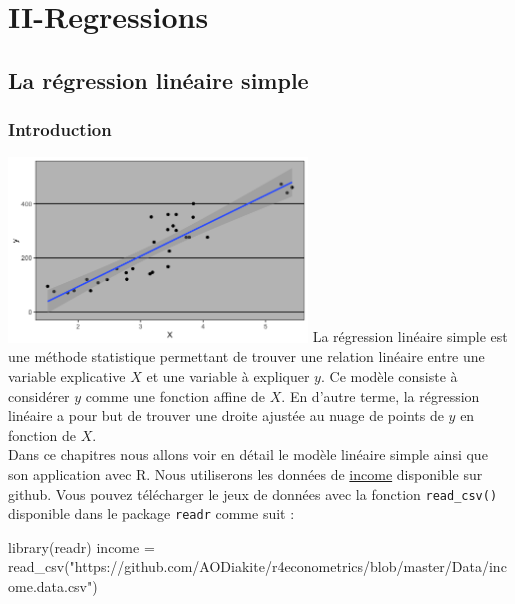 \documentclass[
]{book}
\newenvironment{Shaded}{\begin{snugshade}}{\end{snugshade}}
\newcommand{\FunctionTok}[1]{\textcolor[rgb]{0.00,0.00,0.00}{#1}}
\newcommand{\NormalTok}[1]{#1}
\newcommand{\OtherTok}[1]{\textcolor[rgb]{0.56,0.35,0.01}{#1}}
\newcommand{\StringTok}[1]{\textcolor[rgb]{0.31,0.60,0.02}{#1}}
\theoremstyle{definition}
\theoremstyle{definition}
\theoremstyle{definition}
\theoremstyle{definition}
\theoremstyle{remark}
\begin{document}
\hypertarget{part-ii-regressions}{%
\part{II-Regressions}\label{part-ii-regressions}}

\hypertarget{simple-lm}{%
\chapter{La régression linéaire simple}\label{simple-lm}}

\hypertarget{introduction}{%
\section{Introduction}\label{introduction}}

\includegraphics[width=3.125in,height=\textheight]{Pictures/lm.png}
La régression linéaire simple est une méthode statistique permettant de trouver une relation linéaire entre une variable explicative \(X\) et une variable à expliquer \(y\). Ce modèle consiste à considérer \(y\) comme une fonction affine de \(X\). En d'autre terme, la régression linéaire a pour but de trouver une droite ajustée au nuage de points de \(y\) en fonction de \(X\).\\
Dans ce chapitres nous allons voir en détail le modèle linéaire simple ainsi que son application avec R.
Nous utiliserons les données de \href{https://github.com/AODiakite/r4econometrics/blob/master/Data/income.data.csv}{income} disponible sur github. Vous pouvez télécharger le jeux de données avec la fonction \texttt{read\_csv()} disponible dans le package \texttt{readr} comme suit :

\begin{Shaded}
\begin{Highlighting}[]
\FunctionTok{library}\NormalTok{(readr)}
\NormalTok{income }\OtherTok{=} \FunctionTok{read\_csv}\NormalTok{(}\StringTok{"https://github.com/AODiakite/r4econometrics/blob/master/Data/income.data.csv"}\NormalTok{)}
\end{Highlighting}
\end{Shaded}
\end{document}
